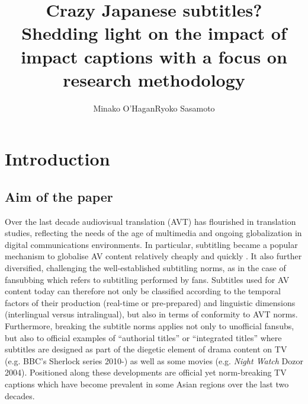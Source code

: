 \documentclass[output=paper]{langsci/langscibook}
\title{Crazy {Japanese} subtitles? {S}hedding light on the impact of impact captions with a focus on research methodology}
\author{Minako O'Hagan\lastand Ryoko Sasamoto\affiliation{Dublin City University}
}
\begin{document}
 
\section{Introduction}

\subsection{Aim of the paper}

Over the last decade audiovisual translation (AVT) has flourished in translation studies, reflecting the needs of the age of multimedia and ongoing globalization in digital communications environments. In particular, subtitling became a popular mechanism to globalise AV content relatively cheaply and quickly \citep[274]{diaz2013}. It also further diversified, challenging the well-established subtitling norms, as in the case of fansubbing which refers to subtitling performed by fans. Subtitles used for AV content today can therefore not only be classified according to the temporal factors of their production (real-time or pre-prepared) and linguistic dimensions (interlingual versus intralingual), but also in terms of conformity to AVT norms.   Furthermore, breaking the subtitle norms applies not only to unofficial fansubs, but also to official examples of ``authorial titles'' \citep{perezgonzalez2012} or ``integrated titles'' \citep{Fox2013} where subtitles are designed as part of the diegetic element of drama content on TV (e.g. BBC's Sherlock series 2010-) as well as some movies (e.g. \textit{Night Watch} Dozor 2004). Positioned along these developments are official yet norm-breaking TV captions which have become prevalent in some Asian regions over the last two decades.   
\end{document}
